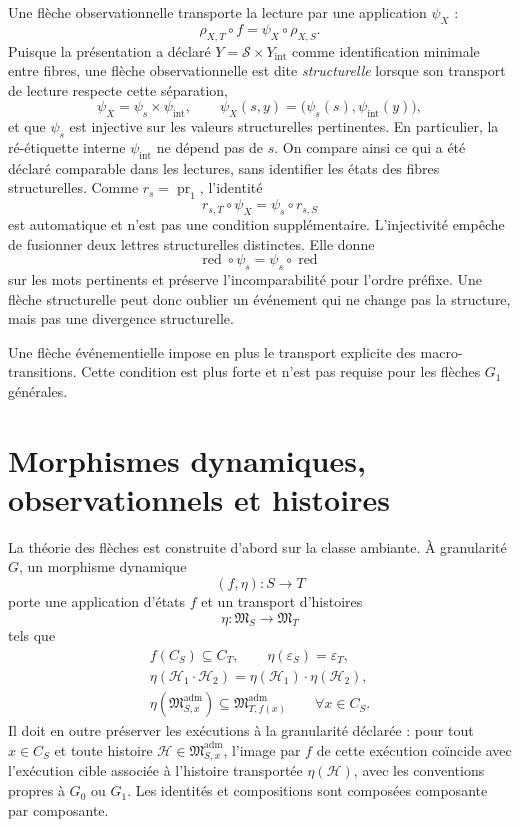 \documentclass[11pt,a4paper]{article}
\theoremstyle{definition}
\theoremstyle{remark}
\newcommand{\Sstruct}{\mathcal S}
\newcommand{\M}{\mathfrak M}
\newcommand{\Madm}{\mathfrak M^{\mathrm{adm}}}
\begin{document}
Une flèche observationnelle transporte la lecture par une application $\psi_X$ :
\[
\rho_{X,T}\circ f=\psi_X\circ\rho_{X,S}.
\]
Puisque la présentation a déclaré $Y=\Sstruct\times Y_{\mathrm{int}}$ comme identification minimale entre fibres, une flèche observationnelle est dite \emph{structurelle} lorsque son transport de lecture respecte cette séparation,
\[
\boxed{\psi_X=\psi_s\times\psi_{\mathrm{int}},\qquad
\psi_X(s,y)=\bigl(\psi_s(s),\psi_{\mathrm{int}}(y)\bigr),}
\]
et que $\psi_s$ est injective sur les valeurs structurelles pertinentes. En particulier, la ré-étiquette interne $\psi_{\mathrm{int}}$ ne dépend pas de $s$. On compare ainsi ce qui a été déclaré comparable dans les lectures, sans identifier les états des fibres structurelles. Comme $r_s=\operatorname{pr}_1$, l'identité
\[
r_{s,T}\circ\psi_X=\psi_s\circ r_{s,S}
\]
est automatique et n'est pas une condition supplémentaire.
L'injectivité empêche de fusionner deux lettres structurelles distinctes. Elle donne
\[
\operatorname{red}\circ\psi_s
=
\psi_s\circ\operatorname{red}
\]
sur les mots pertinents et préserve l'incomparabilité pour l'ordre préfixe. Une flèche structurelle peut donc oublier un événement qui ne change pas la structure, mais pas une divergence structurelle.

Une flèche événementielle impose en plus le transport explicite des macro-transitions. Cette condition est plus forte et n'est pas requise pour les flèches $G_1$ générales.

\section{Morphismes dynamiques, observationnels et histoires}

La théorie des flèches est construite d'abord sur la classe ambiante. À granularité $G$, un morphisme dynamique
\[
(f,\eta):S\longrightarrow T
\]
porte une application d'états $f$ et un transport d'histoires
\[
\eta:\M_S\to\M_T
\]
tels que
\[
\begin{gathered}
f(C_S)\subseteq C_T,\qquad
\eta(\varepsilon_S)=\varepsilon_T,\\
\eta(\mathcal H_1\cdot\mathcal H_2)
=
\eta(\mathcal H_1)\cdot\eta(\mathcal H_2),\\
\eta(\Madm_{S,x})\subseteq\Madm_{T,f(x)}
\qquad\forall x\in C_S.
\end{gathered}
\]
Il doit en outre préserver les exécutions à la granularité déclarée : pour tout $x\in C_S$ et toute histoire $\mathcal H\in\Madm_{S,x}$, l'image par $f$ de cette exécution coïncide avec l'exécution cible associée à l'histoire transportée $\eta(\mathcal H)$, avec les conventions propres à $G_0$ ou $G_1$. Les identités et compositions sont composées composante par composante.
\end{document}
